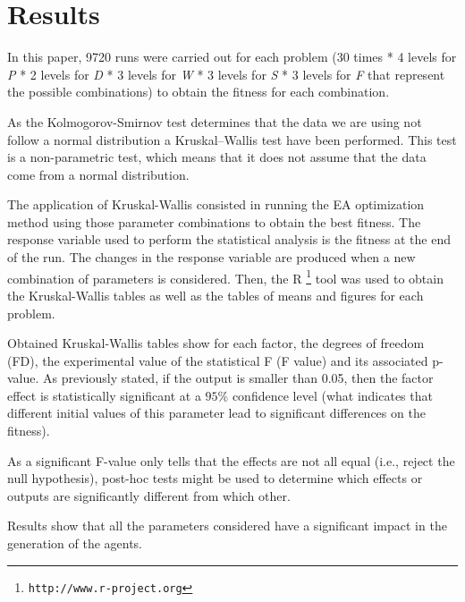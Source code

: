 \documentclass[runningheads,a4paper]{llncs}
\begin{document}

\section{Results}
\label{sec:res}


In this paper, 9720 runs were carried out for each problem (30 times * 4 levels for \emph{P} * 2 levels for \emph{D} * 3 levels for \emph{W} * 3 levels for \emph{S} * 3 levels for \emph{F} that represent the possible combinations) to obtain the fitness for each combination.


As the Kolmogorov-Smirnov test determines that the data we are using not follow a normal distribution a Kruskal–Wallis test have been performed. This test is a non-parametric test, which means that it does not assume that the data come from a normal distribution. 


The application of Kruskal-Wallis consisted in running the EA optimization method using those parameter combinations to obtain the best fitness. 
The response variable used to perform the statistical analysis is the fitness at the end of the run. The changes in the response variable are produced when a new combination of parameters is considered. Then, the {R} \footnote{{\tt http://www.r-project.org}} tool was used to obtain the Kruskal-Wallis tables as well as the tables of means and figures for each problem. 

Obtained Kruskal-Wallis tables show for each factor, the  degrees of freedom (FD), the experimental value of the statistical F (F value) and its associated p-value.
As previously stated, if the output is smaller than 0.05, then the factor effect is statistically significant at a $95\%$ confidence level (what indicates that different initial values of this parameter lead to significant differences on the fitness). 

As a significant F-value only tells  that the effects are not all equal (i.e., reject the null hypothesis), post-hoc tests might be used to determine which effects or outputs are significantly different from which other.

Results show that all the parameters considered have a significant impact in the generation of the agents.
\end{document}
